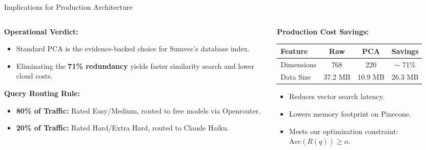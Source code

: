 \documentclass[9pt]{beamer}
\begin{document}
\begin{frame}{Implications for Production Architecture}
    \begin{columns}
        \begin{column}{0.5\textwidth}
            \textbf{Operational Verdict:}
            \begin{itemize}
                \item Standard PCA is the evidence-backed choice for Sumvec's database index.
                \item Eliminating the \textbf{71\% redundancy} yields faster similarity search and lower cloud costs.
            \end{itemize}
            
            \vspace{0.45cm}
            \textbf{Query Routing Rule:}
            \begin{itemize}
                \item \textbf{80\% of Traffic:} Rated Easy/Medium, routed to free models via Openrouter.
                \item \textbf{20\% of Traffic:} Rated Hard/Extra Hard, routed to Claude Haiku.
            \end{itemize}
        \end{column}
        
        \begin{column}{0.5\textwidth}
            \textbf{Production Cost Savings:}
            \vspace{0.2cm}
            \begin{table}
                \centering
                \scriptsize
                \begin{tabular}{lccc}
                    \hline
                    \textbf{Feature} & \textbf{Raw} & \textbf{PCA} & \textbf{Savings} \\ \hline
                    Dimensions & 768 & 220 & $\sim$ 71\% \\
                    Data Size & 37.2 MB & 10.9 MB & 26.3 MB \\ \hline
                \end{tabular}
            \end{table}
            
            \vspace{0.2cm}
            \begin{itemize}
                \scriptsize
                \item Reduces vector search latency.
                \item Lowers memory footprint on Pinecone.
                \item Meets our optimization constraint: $\text{Acc}(R(q)) \ge \alpha$.
            \end{itemize}
        \end{column}
    \end{columns}
\end{frame}
\end{document}
